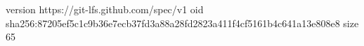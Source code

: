 version https://git-lfs.github.com/spec/v1
oid sha256:87205ef5c1c9b36e7ecb37fd3a88a28fd2823a411f4cf5161b4c641a13e808e8
size 65
